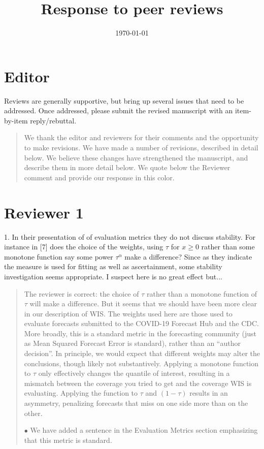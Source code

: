 \documentclass[11pt]{article}
\title{Response to peer reviews}
\author{}
\date{\today}
\newenvironment{resp}{\begin{quote}\color{cobalt}}{\end{quote}}
\begin{document}
\maketitle


\section*{Editor}


  Reviews are generally supportive, but bring up several issues that need to be
  addressed. Once addressed, please submit the revised manuscript with an
  item-by-item reply/rebuttal.  


\begin{resp}
  We thank the editor and reviewers for their comments and the opportunity to make
  revisions. We have made a number of revisions, described in detail below.
  We believe these changes have strengthened the manuscript, and describe them in
  more detail below.
  We quote below the Reviewer comment and provide our response in this color.
\end{resp}


\section*{Reviewer 1}



  1. In their presentation of of evaluation metrics they do not discuss
  stability. For instance in [7] does the choice of the weights, using $\tau$ for
  $x\geq 0$ rather than some monotone function say some power $\tau^\alpha$ make a
  difference? Since as they indicate the measure is used for fitting as well as
  ascertainment, some stability investigation seems appropriate. I suspect here
  is no great effect but...


\begin{resp}
  The reviewer is correct: the choice of $\tau$ rather than a monotone function of
  $\tau$ will make a difference. But it seems that we should have been more clear
  in our description of WIS. The weights used here are those used to evaluate
  forecasts submitted to the COVID-19 Forecast Hub and the CDC. More broadly,
  this is a standard metric in the forecasting community (just as Mean Squared
  Forecast Error is standard), rather than an ``author decision''.  In principle,
  we would expect that different weights may alter the conclusions, though
  likely not substantively. Applying a monotone function to $\tau$ only effectively
  changes the quantile of interest, resulting in a mismatch between the coverage you
  tried to get and the coverage WIS is evaluating. Applying the function to $\tau$
  and $(1-\tau)$ results in an asymmetry, penalizing forecasts that miss on one
  side more than on the other.

  $\bullet$ We have added a sentence in the Evaluation Metrics section emphasizing that
  this metric is standard.
\end{resp}
\end{document}
